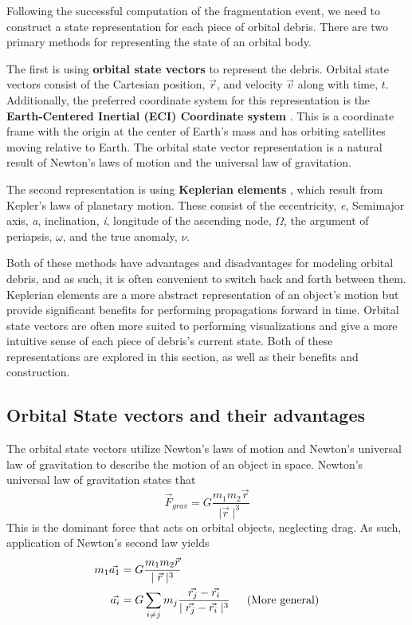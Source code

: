 \documentclass[a4paper, 12pt]{article}
\newcommand{\lindex}[1]{%
	\lowercase{\def\temp{#1}}%
	\expandafter\index\expandafter{\temp}%
}
\newcommand{\boldindex}[1]{%
	\textbf{#1}\lindex{#1}%
}
\begin{document}
Following the successful computation of the fragmentation event, we need to construct a state representation for each piece of orbital debris. There are two primary methods for representing the state of an orbital body.

The first is using \boldindex{orbital state vectors} to represent the debris. Orbital state vectors consist of the Cartesian position, $\vec{r}$, and velocity $\vec{v}$ along with time, $t$. Additionally, the preferred coordinate system for this representation is the \boldindex{Earth-Centered Inertial (ECI) Coordinate system}. This is a coordinate frame with the origin at the center of Earth's mass and has orbiting satellites moving relative to Earth. The orbital state vector representation is a natural result of Newton's laws of motion and the universal law of gravitation.

The second representation is using \boldindex{Keplerian elements}, which result from Kepler's laws of planetary motion. These consist of the eccentricity, \emph{e}, Semimajor axis, \emph{a}, inclination, \emph{i}, longitude of the ascending node, $\Omega$, the argument of periapsis, $\omega$, and the true anomaly, $\nu$. 

Both of these methods have advantages and disadvantages for modeling orbital debris, and as such, it is often convenient to switch back and forth between them. Keplerian elements are a more abstract representation of an object's motion but provide significant benefits for performing propagations forward in time. Orbital state vectors are often more suited to performing visualizations and give a more intuitive sense of each piece of debris's current state. Both of these representations are explored in this section, as well as their benefits and construction.

\subsection{Orbital State vectors and their advantages}

The orbital state vectors utilize Newton's laws of motion and Newton's universal law of gravitation to describe the motion of an object in space. 
Newton's universal law of gravitation states that $$\vec{F}_{grav} = G\frac{ m_1 m_2 \vec{r}}{\mid\vec{r}\mid^3}$$ \noindent This is the dominant force that acts on orbital objects, neglecting drag. As such, application of Newton's second law yields
\begin{align}
	m_1 \vec{a_1}  & = G\frac{m_1 m_2 \vec{r}}{\mid\vec{r}\mid^3}\\
	\vec{a_i}  &= G \sum_{i \ne j}  m_j \frac{\vec{r_j} -\vec{r_i}}{\mid\vec{r_j} - \vec{r_i}\mid^3} \indent\text{(More general)}
\end{align}
\end{document}
